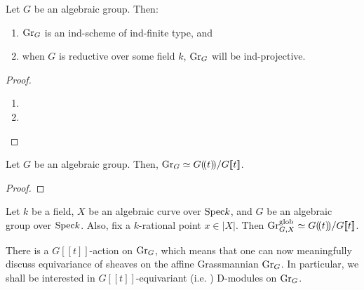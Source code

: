                    \begin{proposition} \label{prop: structure_of_affine_grassmannian}
                        Let $G$ be an algebraic group. Then:
                            \begin{enumerate}
                                \item $\mathrm{Gr}_G$ is an ind-scheme of ind-finite type, and
                                \item when $G$ is reductive over some field $k$, $\mathrm{Gr}_G$ will be ind-projective.
                            \end{enumerate}
                    \end{proposition}
                        \begin{proof}
                            \noindent
                            \begin{enumerate}
                                \item 
                                \item 
                            \end{enumerate}
                        \end{proof}
                        
                    \begin{proposition} \label{prop: affine_grassmannians_as_coset_spaces}
                        Let $G$ be an algebraic group. Then, $\mathrm{Gr}_G \simeq G(\!(t)\!)/G[\![t]\!]$.
                    \end{proposition}
                        \begin{proof}
                            
                        \end{proof}
                    \begin{corollary}
                        Let $k$ be a field, $X$ be an algebraic curve over $\mathrm{Spec} k$, and $G$ be an algebraic group over $\mathrm{Spec} k$. Also, fix a $k$-rational point $x \in |X|$. Then $\mathrm{Gr}_{G, X}^{\mathrm{glob}} \simeq G(\!(t)\!)/G[\![t]\!]$.
                    \end{corollary}
                    \begin{corollary} \label{coro: loop_group_action_on_grassmannians}
                        There is a $G[\![t]\!]$-action on $\mathrm{Gr}_G$, which means that one can now meaningfully discuss equivariance of sheaves on the affine Grassmannian $\mathrm{Gr}_G$. In particular, we shall be interested in $G[\![t]\!]$-equivariant (i.e. ) D-modules on $\mathrm{Gr}_G$.
                    \end{corollary}
                    
